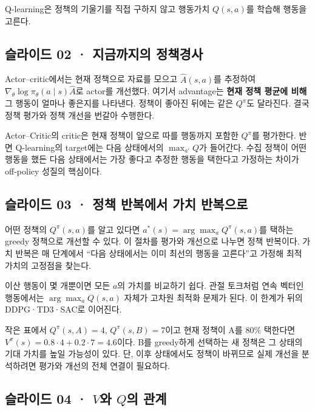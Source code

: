 \documentclass[11pt,a4paper]{article}
\begin{document}
Q-learning은 정책의 기울기를 직접 구하지 않고 행동가치 $Q(s,a)$를 학습해 행동을 고른다.\par

\subsection{슬라이드 02 · 지금까지의 정책경사}

Actor–critic에서는 현재 정책으로 자료를 모으고 $\widehat A(s,a)$를 추정하여 $\nabla_\theta\log\pi_\theta(a\mid s)\widehat A$로 actor를 개선했다. 여기서 advantage는 \textbf{현재 정책 평균에 비해} 그 행동이 얼마나 좋은지를 나타낸다. 정책이 좋아진 뒤에는 같은 $Q^\pi$도 달라진다. 결국 정책 평가와 정책 개선을 번갈아 수행한다.\par

Actor–Critic의 critic은 현재 정책이 앞으로 따를 행동까지 포함한 $Q^\pi$를 평가한다. 반면 Q-learning의 target에는 다음 상태에서의 $\max_{a'}Q$가 들어간다. 수집 정책이 어떤 행동을 했든 다음 상태에서는 가장 좋다고 추정한 행동을 택한다고 가정하는 차이가 off-policy 성질의 핵심이다.\par

\subsection{슬라이드 03 · 정책 반복에서 가치 반복으로}

어떤 정책의 $Q^\pi(s,a)$를 알고 있다면 $a^*(s)=\arg\max_a Q^\pi(s,a)$를 택하는 greedy 정책으로 개선할 수 있다. 이 절차를 평가와 개선으로 나누면 정책 반복이다. 가치 반복은 매 단계에서 “다음 상태에서는 이미 최선의 행동을 고른다”고 가정해 최적 가치의 고정점을 찾는다.\par

이산 행동이 몇 개뿐이면 모든 $a$의 가치를 비교하기 쉽다. 관절 토크처럼 연속 벡터인 행동에서는 $\arg\max_a Q(s,a)$ 자체가 고차원 최적화 문제가 된다. 이 한계가 뒤의 DDPG·TD3·SAC로 이어진다.\par

작은 표에서 $Q^\pi(s,A)=4$, $Q^\pi(s,B)=7$이고 현재 정책이 A를 80\% 택한다면 $V^\pi(s)=0.8\cdot4+0.2\cdot7=4.6$이다. B를 greedy하게 선택하는 새 정책은 그 상태의 기대 가치를 높일 가능성이 있다. 단, 이후 상태에서도 정책이 바뀌므로 실제 개선을 분석하려면 평가와 개선의 전체 연결이 필요하다.\par

\subsection{슬라이드 04 · $V$와 $Q$의 관계}
\end{document}
